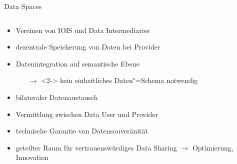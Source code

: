 \begin{frame}{Data Spaces \footnotesize\cite{mollerIndustrialDataEcosystems2024}}
    \begin{columns}
        \begin{column}{0.6\textwidth}
            \begin{itemize}
                \item Vereinen von IOIS und Data Intermediaries
                \item dezentrale Speicherung von Daten bei Provider
                
                \item<2-> Datenintegration auf semantische Ebene
                \begin{itemize}
                    \item[$\to$]<2-> kein einheitliches Daten"=Schema notwendig
                \end{itemize}
                
                \item<3-> bilateraler Datenaustausch
                \item<3-> Vermittlung zwischen Data User und Provider
                

                \item<4-> technische Garantie von Datensouveränität
                \item<4-> geteilter Raum für vertrauenswürdiges Data Sharing $\to$ Optimierung, Innovation

\end{itemize}
\end{column}
\end{columns}
\end{frame}
